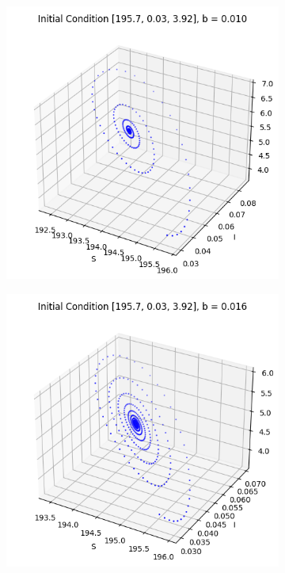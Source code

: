 \begin{itemize}
\begin{figure}[H]
\centering
\begin{subfigure}[b]{0.3\textwidth}
    \centering
    \includegraphics[width=\textwidth]{images/task5/ex4_t5_2_b_1.png}
    \label{fig:subfig_b1}
\end{subfigure}
\begin{subfigure}[b]{0.3\textwidth}
    \centering
    \includegraphics[width=\textwidth]{images/task5/ex4_t5_2_b_7.png}

\end{subfigure}
\end{figure}
\end{itemize}
